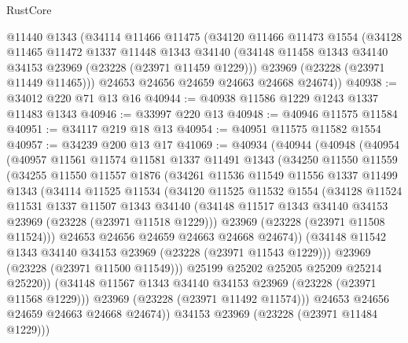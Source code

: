 \begin{lexlean}{RustCore}
\begin{coremodule}
    @11440
    @1343
    (@34114
      @11466
      @11475
      (@34120
        @11466
        @11473
        @1554
        (@34128
          @11465
          @11472
          @1337
          @11448
          @1343
          @34140
          (@34148 @11458 @1343 @34140 @34153 @23969 (@23228 (@23971 @11459 @1229)))
          @23969
          (@23228 (@23971 @11449 @11465)))
        @24653
        @24656
        @24659
        @24663
        @24668
        @24674))
@40938 := @34012 @220 @71 @13 @16
@40944 := @40938 @11586 @1229 @1243 @1337 @11483 @1343
@40946 := @33997 @220 @13
@40948 := @40946 @11575 @11584
@40951 := @34117 @219 @18 @13
@40954 := @40951 @11575 @11582 @1554
@40957 := @34239 @200 @13 @17
@41069 := @40934
    (@40944
      (@40948
        (@40954
          (@40957
            @11561
            @11574
            @11581
            @1337
            @11491
            @1343
            (@34250
              @11550
              @11559
              (@34255
                @11550
                @11557
                @1876
                (@34261
                  @11536
                  @11549
                  @11556
                  @1337
                  @11499
                  @1343
                  (@34114
                    @11525
                    @11534
                    (@34120
                      @11525
                      @11532
                      @1554
                      (@34128
                        @11524
                        @11531
                        @1337
                        @11507
                        @1343
                        @34140
                        (@34148 @11517 @1343 @34140 @34153 @23969 (@23228 (@23971 @11518 @1229)))
                        @23969
                        (@23228 (@23971 @11508 @11524)))
                      @24653
                      @24656
                      @24659
                      @24663
                      @24668
                      @24674))
                  (@34148 @11542 @1343 @34140 @34153 @23969 (@23228 (@23971 @11543 @1229)))
                  @23969
                  (@23228 (@23971 @11500 @11549)))
                @25199
                @25202
                @25205
                @25209
                @25214
                @25220))
            (@34148 @11567 @1343 @34140 @34153 @23969 (@23228 (@23971 @11568 @1229)))
            @23969
            (@23228 (@23971 @11492 @11574)))
          @24653
          @24656
          @24659
          @24663
          @24668
          @24674))
      @34153
      @23969
      (@23228 (@23971 @11484 @1229)))

\end{coremodule}
\end{lexlean}
